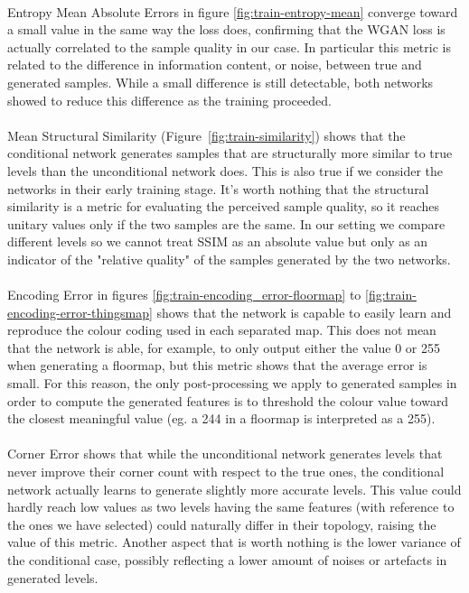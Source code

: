 \paragraph{} Entropy Mean Absolute Errors in figure \ref{fig:train-entropy-mean} converge toward a small value in the same way the loss does, confirming that the WGAN loss is actually correlated to the sample quality in our case. In particular this metric is related to the difference in information content, or noise, between true and generated samples. While a small difference is still detectable, both networks showed to reduce this difference as the training proceeded.

\paragraph{} Mean Structural Similarity (Figure~\ref{fig:train-similarity}) shows that the conditional network generates samples that are structurally more similar to true levels than the unconditional network does. This is also true if we consider the networks in their early training stage. It's worth nothing that the structural similarity is a metric for evaluating the perceived sample quality, so it reaches unitary values only if the two samples are the same. In our setting we compare different levels so we cannot treat SSIM as an absolute value but only as an indicator of the "relative quality" of the samples generated by the two networks.

\paragraph{} Encoding Error in figures \ref{fig:train-encoding_error-floormap} to \ref{fig:train-encoding-error-thingsmap} shows that the network is capable to easily learn and reproduce the colour coding used in each separated map. This does not mean that the network is able, for example, to only output either the value 0 or 255 when generating a floormap, but this metric shows that the average error is small. For this reason, the only post-processing we apply to generated samples in order to compute the generated features is to threshold the colour value toward the closest meaningful value (eg. a 244 in a floormap is interpreted as a 255). 

\paragraph{} Corner Error shows that while the unconditional network generates levels that never improve their corner count with respect to the true ones, the conditional network actually learns to generate slightly more accurate levels. This value could hardly reach low values as two levels having the same features (with reference to the ones we have selected) could naturally differ in their topology, raising the value of this metric. Another aspect that is worth nothing is the lower variance of the conditional case, possibly reflecting a lower amount of noises or artefacts in generated levels.

